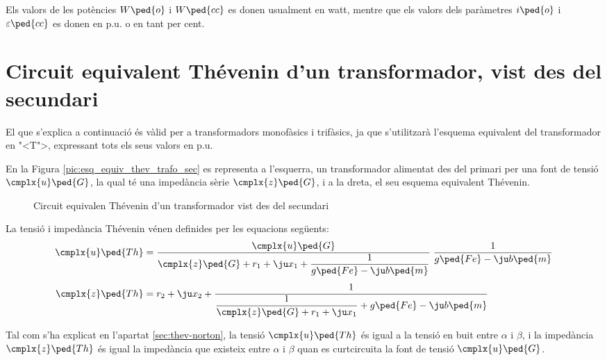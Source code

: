 Els valors de les pot\`{e}ncies $W\ped{o}$ i $W\ped{cc}$ es donen
usualment en watt, mentre que els valors dels par\`{a}metres $i\ped{o}$
i $\varepsilon\ped{cc}$ es donen en p.u. o en tant per cent.

\section{Circuit equivalent Th\'{e}venin d'un transformador, vist des del secundari}

El que s'explica a continuaci\'{o} \'{e}s v\`{a}lid per a transformadors
monof\`{a}sics i trif\`{a}sics, ja que s'utilitzar\`{a} l'esquema equivalent del
transformador en {"<}T{">}, expressant tots els seus valors en p.u.

En la Figura \vref{pic:esq_equiv_thev_trafo_sec}  es representa a
l'esquerra, un transformador alimentat des del primari per una font
de tensi\'{o} $\cmplx{u}\ped{G}$, la qual t\'{e} una imped\`{a}ncia s\`{e}rie
$\cmplx{z}\ped{G}$, i a  la dreta, el seu esquema equivalent
Th\'{e}venin.

\begin{figure}[htb]
\centering
    
\caption{Circuit equivalen Th\'{e}venin d'un transformador vist des del
secundari} \label{pic:esq_equiv_thev_trafo_sec}
\end{figure}

La tensi\'{o} i imped\`{a}ncia Th\'{e}venin v\'{e}nen definides per les equacions
seg\"{u}ents:
\begin{align}
    \cmplx{u}\ped{Th} &= \frac{\cmplx{u}\ped{G}}{\cmplx{z}\ped{G} + r_1 + \ju
    x_1 + \dfrac{1}{g\ped{Fe}-\ju b\ped{m}}} \;\frac{1}{g\ped{Fe}-\ju
    b\ped{m}} \label{eq:trafo_uth}\\[1ex]
    \cmplx{z}\ped{Th} &= r_2 + \ju x_2 + \frac{1}{\dfrac{1}{\cmplx{z}\ped{G} + r_1 +
    \ju x_1} + g\ped{Fe}-\ju b\ped{m}}\label{eq:trafo_zth}
\end{align}

Tal com s'ha explicat en l'apartat \vref{sec:thev-norton}, la tensi\'{o}
$\cmplx{u}\ped{Th}$ \'{e}s igual a la tensi\'{o} en buit entre $\alpha$ i
$\beta$, i la imped\`{a}ncia $\cmplx{z}\ped{Th}$ \'{e}s igual la imped\`{a}ncia
que existeix entre $\alpha$ i $\beta$ quan es curtcircuita la font
de tensi\'{o} $\cmplx{u}\ped{G}$.

